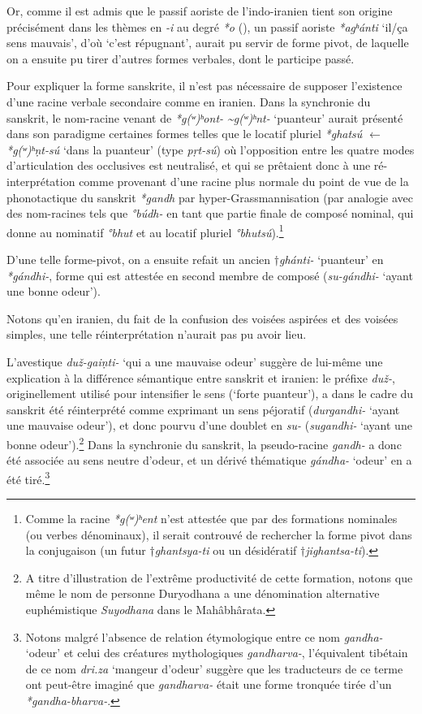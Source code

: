 \documentclass[11pt]{article}
\newcommand{\ipa}[1]{{\phon\textit{#1}}}
\begin{document}
Or, comme il est admis que le passif aoriste de l'indo-iranien tient son origine précisément dans les thèmes en \ipa{-i} au degré \ipa{*o} (\citealt[15]{kummel96stativ}), un passif aoriste \ipa{*agʰánti} `il/ça sens mauvais', d'où `c'est répugnant', aurait pu servir de forme pivot, de laquelle on a ensuite pu tirer d'autres formes verbales, dont le participe passé.

Pour expliquer la forme sanskrite, il n'est pas nécessaire de supposer l'existence d'une racine verbale secondaire comme en iranien. Dans la synchronie du sanskrit, le nom-racine venant de \ipa{*g(ʷ)ʰont- \textasciitilde *g(ʷ)ʰnt-} `puanteur' aurait présenté dans son paradigme certaines formes telles que le locatif pluriel \ipa{*ghatsú} $\leftarrow$ \ipa{*g(ʷ)ʰṇt-sú} `dans la puanteur' (type \ipa{pṛt-sú}) où l'opposition entre les quatre modes d'articulation des occlusives est neutralisé, et qui se prêtaient donc à une ré-interprétation comme provenant d'une racine plus normale du point de vue de la phonotactique du sanskrit \ipa{*gandh} par hyper-Grassmannisation (par analogie avec des nom-racines tels que \ipa{°búdh-} en tant que partie finale de composé nominal, qui donne au nominatif \ipa{°bhut} et au locatif pluriel \ipa{°bhutsú}).\footnote{Comme la racine \ipa{*g(ʷ)ʰent} n'est attestée que par des formations nominales (ou verbes dénominaux), il serait controuvé de rechercher la forme pivot dans la conjugaison (un futur $\dagger$\ipa{ghantsya-ti} ou un désidératif $\dagger$\ipa{jighantsa-ti}). }

D'une telle forme-pivot, on a ensuite refait un ancien $\dagger$\ipa{ghánti-} `puanteur' en \ipa{*gándhi-}, forme qui est attestée en second membre de composé (\ipa{su-gándhi-} `ayant une bonne odeur').

Notons qu'en iranien, du fait de la confusion des voisées aspirées et des voisées simples, une telle réinterprétation n'aurait pas pu avoir lieu.

L'avestique \ipa{duž-gaiṇti-} `qui a une mauvaise odeur' suggère de lui-même une explication à la différence sémantique entre sanskrit et iranien: le préfixe \ipa{duž-}, originellement utilisé pour intensifier le sens (`forte puanteur'), a dans le cadre du sanskrit été réinterprété comme exprimant un sens péjoratif (\ipa{durgandhi-} `ayant une mauvaise odeur'), et donc pourvu d'une doublet en \ipa{su-} (\ipa{sugandhi-} `ayant une bonne odeur').\footnote{A titre d'illustration de l'extrême productivité de cette formation, notons que même le nom de personne Duryodhana a  une dénomination alternative euphémistique \textit{Suyodhana} dans le Mahâbhârata.} Dans la synchronie du sanskrit, la pseudo-racine \ipa{gandh-} a donc été associée au sens neutre d'odeur, et un dérivé thématique \ipa{gándha-} `odeur' en a été tiré.\footnote{Notons malgré l'absence de relation étymologique entre ce nom \ipa{gandha-} `odeur' et celui des créatures mythologiques \ipa{gandharva-}, l'équivalent tibétain de ce nom \ipa{dri.za} `mangeur d'odeur' suggère que les traducteurs de ce terme ont peut-être imaginé que \ipa{gandharva-} était une forme tronquée tirée d'un \ipa{*gandha-bharva-}.}
\end{document}

